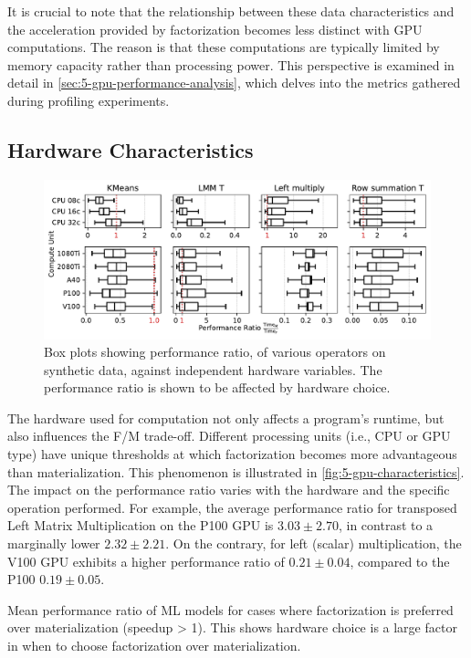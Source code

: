 It is crucial to note that the relationship between these data characteristics and the acceleration provided by factorization becomes less distinct with GPU computations. The reason is that these computations are typically limited by memory capacity rather than processing power. This perspective is examined in detail in \autoref{sec:5-gpu-performance-analysis}, which delves into the metrics gathered during profiling experiments.

\subsection{Hardware Characteristics}
\begin{figure}[ht]
  \centering
  \includegraphics[width=\linewidth]{chapters/05_cost_estimation/figures/motivation_speedup_per_operator_per_gpu.pdf}
  \caption[Box plots showing performance ratio against hardware]{Box plots showing performance ratio, of various operators on synthetic data, against independent hardware variables. The performance ratio is shown to be affected by hardware choice.}
  \label{fig:5-gpu-characteristics}
\end{figure}
The hardware used for computation not only affects a program's runtime, but also influences the F/M trade-off. Different processing units (i.e., CPU or GPU type) have unique thresholds at which factorization becomes more advantageous than materialization. This phenomenon is illustrated in \autoref{fig:5-gpu-characteristics}. The impact on the performance ratio varies with the hardware and the specific operation performed. For example, the average performance ratio for transposed Left Matrix Multiplication on the P100 GPU is $3.03\pm2.70$, in contrast to a marginally lower $2.32\pm2.21$. On the contrary, for left (scalar) multiplication, the V100 GPU exhibits a higher performance ratio of $0.21\pm0.04$, compared to the P100 $0.19\pm0.05$.

\begin{table}[ht]
  \centering
  
  \caption[Performance ratio of ML models for cases where factorization has positive impact.]{Mean performance ratio of ML models for cases where factorization is preferred over materialization (speedup > 1). This shows hardware choice is a large factor in when to choose factorization over materialization.}
  \label{tab:5-speedup-per-gpu}
\end{table}

